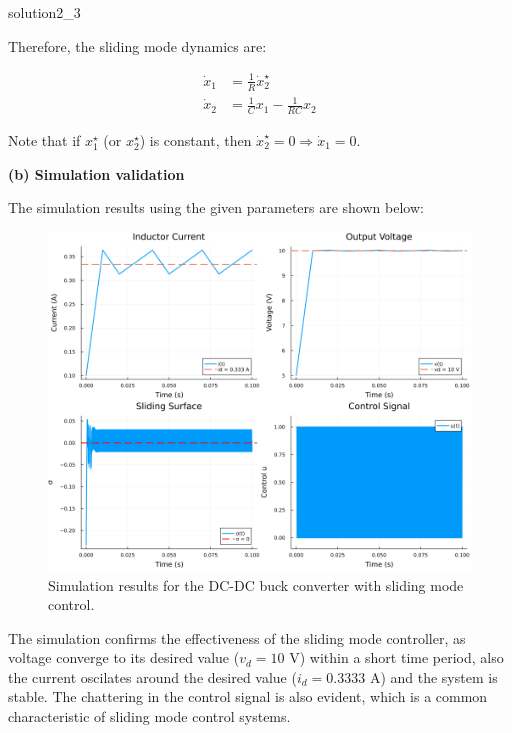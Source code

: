 \begin{solution}{}{solution2_3}
\begin{enumerate}
		      Therefore, the sliding mode dynamics are:

		      $$
			      \begin{aligned}
				      \dot{x}_1 & = \frac{1}{R}\dot{x}_2^{\star}     \\
				      \dot{x}_2 & = \frac{1}{C}x_1 - \frac{1}{RC}x_2
			      \end{aligned}
		      $$

		      Note that if $x_1^{\star}$ (or $x_2^{\star}$) is constant, then $\dot{x}_2^{\star} = 0 \Rightarrow \dot{x}_1 = 0$.
	\end{enumerate}

	\textbf{(b) Simulation validation}

	The simulation results using the given parameters are shown below:
	\begin{figure}[H]
		\centering
		\includegraphics[width=1\textwidth]{img/problem2_3.png}
		\caption{Simulation results for the DC-DC buck converter with sliding mode control.}
		\label{fig:problem2_3}
	\end{figure}

	The simulation confirms the effectiveness of the sliding mode controller, as voltage converge to its desired value ($v_d = 10$ V) within a short time period, also the current oscilates around the desired value ($i_d = 0.3333$ A) and the system is stable. The chattering in the control signal is also evident, which is a common characteristic of sliding mode control systems.
\end{solution}